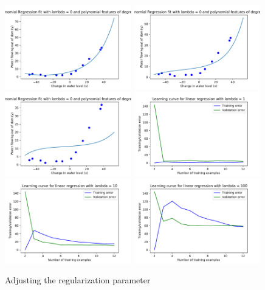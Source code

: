 \documentclass[]{book}
\theoremstyle{definition}
\begin{document}
\begin{figure}[H]
	\includegraphics[width=5.5cm]{fig9_1.pdf}
	\includegraphics[width=5.5cm]{fig9_10.pdf}
	\includegraphics[width=5.5cm]{fig9_100.pdf}
	\includegraphics[width=5.5cm]{fig10_1.pdf}
	\includegraphics[width=5.5cm]{fig10_10.pdf}
	\includegraphics[width=5.5cm]{fig10_100.pdf}
	\caption{Adjusting the regularization parameter}
	\label{fig:11}
\end{figure}
\end{document}
